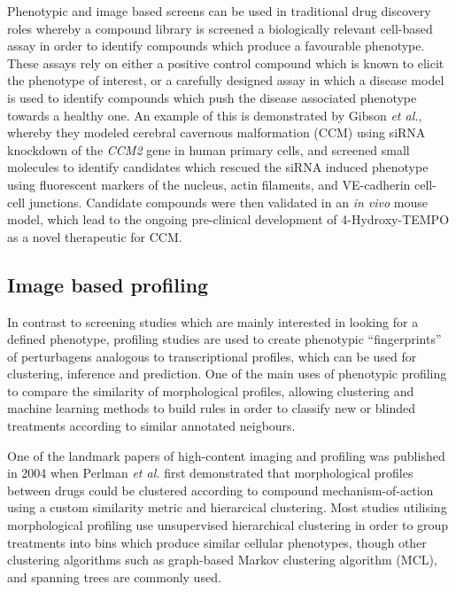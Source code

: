 \documentclass[a4paper,11pt,twoside,openright]{scrbook}
\begin{document}
Phenotypic and image based screens can be used in traditional drug discovery roles whereby a compound library is screened a biologically relevant cell-based assay in order to identify compounds which produce a favourable phenotype.
These assays rely on either a positive control compound which is known to elicit the phenotype of interest, or a carefully designed assay in which a disease model is used to identify compounds which push the disease associated phenotype towards a healthy one.
An example of this is demonstrated by Gibson \textit{et al.}, \cite{Gibson2015} whereby they modeled cerebral cavernous malformation (CCM) using siRNA knockdown of the \textit{CCM2} gene in human primary cells, and screened small molecules to identify candidates which rescued the siRNA induced phenotype using fluorescent markers of the nucleus, actin filaments, and VE-cadherin cell-cell junctions.
Candidate compounds were then validated in an \textit{in vivo} mouse model, which lead to the ongoing pre-clinical development of 4-Hydroxy-TEMPO as a novel therapeutic for CCM.


\subsection{Image based profiling}
In contrast to screening studies which are mainly interested in looking for a defined phenotype, profiling studies are used to create phenotypic ``fingerprints'' of perturbagens analogous to transcriptional profiles, which can be used for clustering, inference and prediction.
One of the main uses of phenotypic profiling to compare the similarity of morphological profiles, allowing clustering and machine learning methods to build rules in order to classify new or blinded treatments according to similar annotated neigbours.

One of the landmark papers of high-content imaging and profiling was published in 2004 when Perlman \textit{et al.} \cite{Perlman2004} first demonstrated that morphological profiles between drugs could be clustered according to compound mechanism-of-action using a custom similarity metric and hierarcical clustering.
Most studies utilising morphological profiling use unsupervised hierarchical clustering in order to group treatments into bins which produce similar cellular phenotypes, \cite{Gustafsdottir2013,Young2008} though other clustering algorithms such as graph-based Markov clustering algorithm (MCL), \cite{Reisen2015,VanDongen2008} and spanning trees \cite{Qiu2011} are commonly used.
\end{document}
